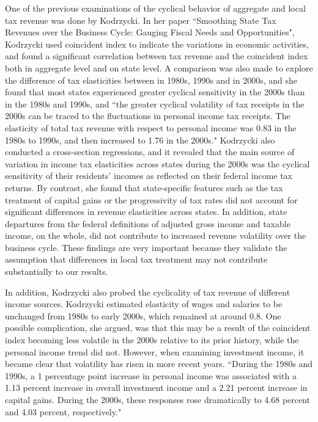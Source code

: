 \documentclass{article}
\begin{document}
One of the previous examinations of the cyclical behavior of aggregate and local tax revenue was done by Kodrzycki. In her paper ``Smoothing State Tax Revenues over the Business Cycle: Gauging Fiscal Needs and Opportunities", Kodrzycki used coincident index to indicate the variations in economic activities, and found a significant correlation between tax revenue and the coincident index both in aggregate level and on state level. A comparison was also made to explore the difference of tax elasticities between in 1980s, 1990s and in 2000s, and she found that most states experienced greater cyclical sensitivity in the 2000s than in the 1980s and 1990s, and ``the greater cyclical volatility of tax receipts in the 2000s can be traced to the fluctuations in personal income tax receipts. The elasticity of total tax revenue with respect to personal income was 0.83 in the 1980s to 1990s, and then increased to 1.76 in the 2000s." Kodrzycki also conducted a cross-section regressions, and it revealed that the main source of variation in income tax elasticities across states during the 2000s was the cyclical sensitivity of their residents' incomes as reflected on their federal income tax
returns. By contrast, she found that state-specific features such as the tax treatment of capital gains or the progressivity of tax rates did not account for significant differences in revenue elasticities across states. In addition, state departures from the federal definitions of adjusted gross income and taxable income, on the whole, did not contribute to increased revenue volatility over the business cycle. These findings are very important because they validate the assumption that differences in local tax treatment may not contribute substantially to our results. 

In addition, Kodrzycki also probed the cyclicality of tax revenue of different income sources. Kodrzycki estimated elasticity of wages and salaries to be unchanged from 1980s to early 2000s, which remained at around 0.8. One possible complication, she argued, was that this may be a result of the coincident index becoming less volatile in the 2000s relative to its prior history, while the personal income trend did not. However, when examining investment income, it became clear that volatility has risen in more recent years. ``During the 1980s and 1990s, a 1 percentage point increase in personal income was associated with a 1.13 percent increase in overall investment income and a 2.21 percent increase in capital gains. During the 2000s, these responses rose dramatically to 4.68 percent and 4.03 percent, respectively."
\end{document}
